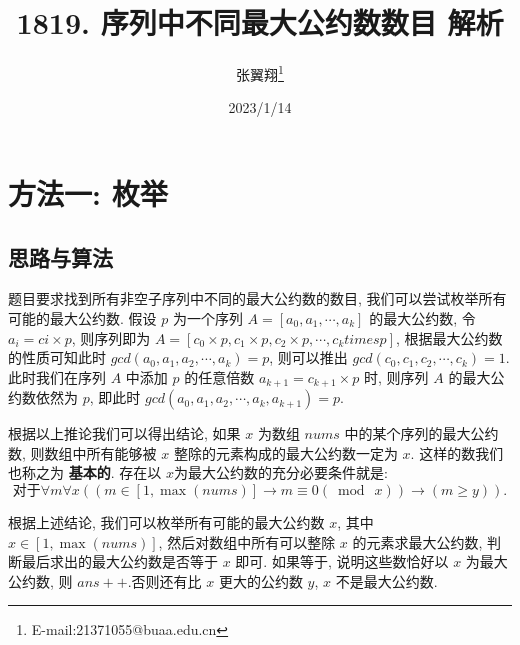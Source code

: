 \documentclass[12pt]{ctexart}
\begin{document}
\title{1819. 序列中不同最大公约数数目 解析}
\author{张翼翔\thanks{E-mail:21371055@buaa.edu.cn}}
\date{2023/1/14}

\maketitle

\section{方法一: 枚举}

\subsection{思路与算法}
题目要求找到所有非空子序列中不同的最大公约数的数目, 我们可以尝试枚举所有可能的最大公约数. 假设 $p$ 为一个序列 $A = [a_0, a_1, \cdots, a_k]$ 的最大公约数, 令 $a_i = ci \times p$, 则序列即为 $A = [c_0 \times p, c_1 \times p, c_2 \times p, \cdots, c_k times p]$, 根据最大公约数的性质可知此时 $gcd(a_0, a_1, a_2, \cdots,  a_k) = p$, 则可以推出 $gcd(c_0, c_1, c_2, \cdots, c_k) = 1$. 此时我们在序列 $A$ 中添加 $p$ 的任意倍数 $a_{k + 1} = c_{k + 1} \times p$ 时, 则序列 $A$ 的最大公约数依然为 $p$, 即此时 $gcd(a_0, a_1, a_2, \cdots, a_k, a_{k + 1}) = p$.

根据以上推论我们可以得出结论, 如果 $x$ 为数组 $nums$ 中的某个序列的最大公约数, 则数组中所有能够被 $x$ 整除的元素构成的最大公约数一定为 $x$. 这样的数我们也称之为 \textbf{基本的}. 存在以 $x$为最大公约数的充分必要条件就是:
\begin{equation}
    \text{对于} \forall m \forall x ((m \in [1, \max(nums)] \to m \equiv 0 (\bmod\ x)) \to (m \geqslant y)). \label{subsec:eq1}
\end{equation}

根据上述结论, 我们可以枚举所有可能的最大公约数 $x$, 其中 $x \in [1, \max(nums)]$, 然后对数组中所有可以整除 $x$ 的元素求最大公约数, 判断最后求出的最大公约数是否等于 $x$ 即可. 如果等于, 说明这些数恰好以 $x$ 为最大公约数, 则 $ans++$.否则还有比 $x$ 更大的公约数 $y$, $x$ 不是最大公约数.
\end{document}
